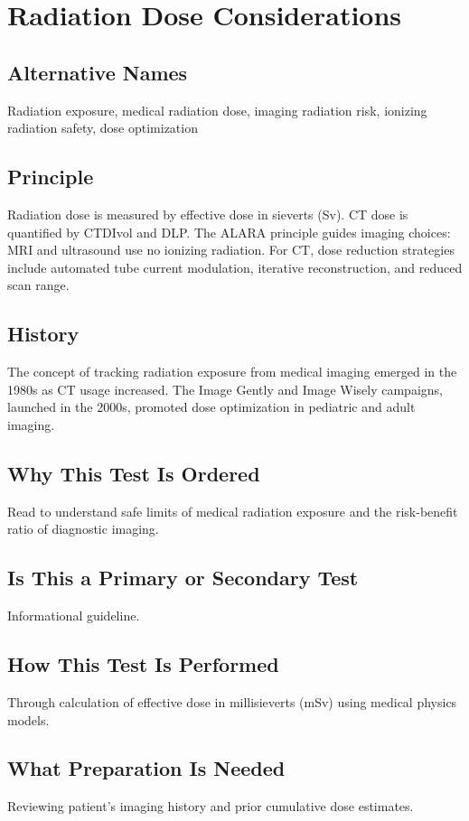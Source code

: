\chapter{Radiation Dose Considerations}

\section*{Alternative Names}
Radiation exposure, medical radiation dose, imaging radiation risk, ionizing radiation safety, dose optimization


\section*{Principle}
Radiation dose is measured by effective dose in sieverts (Sv). CT dose is quantified by CTDIvol and DLP. The ALARA principle guides imaging choices: MRI and ultrasound use no ionizing radiation. For CT, dose reduction strategies include automated tube current modulation, iterative reconstruction, and reduced scan range.

\section*{History}
The concept of tracking radiation exposure from medical imaging emerged in the 1980s as CT usage increased. The Image Gently and Image Wisely campaigns, launched in the 2000s, promoted dose optimization in pediatric and adult imaging.

\section*{Why This Test Is Ordered}
Read to understand safe limits of medical radiation exposure and the risk-benefit ratio of diagnostic imaging.

\section*{Is This a Primary or Secondary Test}
Informational guideline.

\section*{How This Test Is Performed}
Through calculation of effective dose in millisieverts (mSv) using medical physics models.

\section*{What Preparation Is Needed}
Reviewing patient's imaging history and prior cumulative dose estimates.

